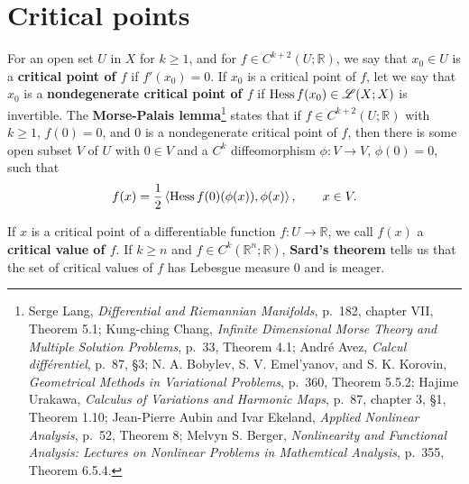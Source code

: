 \documentclass{article}
\newcommand{\inner}[2]{\left\langle #1, #2 \right\rangle}
\newcommand{\Hess}{\ensuremath\mathrm{Hess}\,}
\theoremstyle{definition}
\begin{document}
\section{Critical points}
For an open set $U$ in $X$ for $k \geq 1$, and for $f \in C^{k+2}(U;\mathbb{R})$, we say that $x_0 \in U$ is a \textbf{critical point of
$f$} if $f'(x_0)=0$. If $x_0$ is a critical point of $f$, let we say that $x_0$ is a \textbf{nondegenerate critical point of $f$}
if $\Hess f(x_0) \in \mathscr{L}(X;X)$ is invertible. 
The \textbf{Morse-Palais lemma}\footnote{Serge Lang, {\em Differential and Riemannian Manifolds},
p.~182, chapter VII, Theorem 5.1; Kung-ching Chang, {\em Infinite Dimensional Morse Theory and Multiple
Solution Problems}, p.~33, Theorem 4.1; 
Andr\'e Avez, {\em Calcul diff\'erentiel}, p.~87, \S 3;
N. A. Bobylev, S. V. Emel'yanov, and S. K. Korovin, {\em Geometrical Methods in Variational Problems}, p.~360, Theorem 5.5.2;
Hajime Urakawa, {\em Calculus of Variations and Harmonic Maps}, p.~87, chapter 3, \S  1, Theorem 1.10;
Jean-Pierre Aubin and Ivar Ekeland, {\em Applied Nonlinear Analysis}, p.~52, Theorem 8;
Melvyn S. Berger, {\em Nonlinearity and Functional Analysis: Lectures on Nonlinear Problems in Mathemtical Analysis},
p.~355, Theorem 6.5.4.}
states that if
$f \in C^{k+2}(U;\mathbb{R})$ with $k \geq 1$, $f(0)=0$, and $0$ is a nondegenerate critical point of $f$, then there is some
open subset $V$ of $U$ with $0 \in V$ and
a $C^k$ diffeomorphism $\phi:V \to V$, $\phi(0)=0$, such that
\[
f(x) = \frac{1}{2}\inner{\Hess f(0)(\phi(x))}{\phi(x)}, \qquad x \in V.
\]


If $x$ is a critical point of a differentiable function $f:U \to \mathbb{R}$, we call $f(x)$ a \textbf{critical value of $f$}.
If $k \geq n$ and $f \in C^k(\mathbb{R}^n;\mathbb{R})$, \textbf{Sard's theorem} tells us that
 the set of critical values of $f$ has Lebesgue measure  $0$ and is meager.
 
\end{document}
